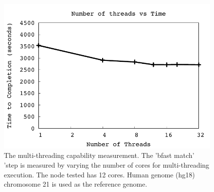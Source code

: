 \documentclass{acm_proc_article-sp}
\begin{document}
 \begin{figure}
 \centering
\includegraphics[scale=0.66]{figures/threadsvstime.pdf} 

\caption{\small The multi-threading capability measurement.  The 'bfast match' 'step is measured by varying the number of cores for multi-threading execution.  The node tested has 12 cores.  Human genome (hg18) chromosome 21 is used as the reference genome.  }
  \label{fig:parallel-execution} 
 \end{figure}
\end{document}
